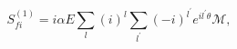 \begin{equation}
S_{fi}^{\left( 1\right) }=i\alpha E \sum_{l}\left( i\right)
^{l}\sum_{l^{\prime }}\left( -i\right) ^{l^{\prime }}e^{il^{\prime }\theta }%
\mathcal{M},
\end{equation}


